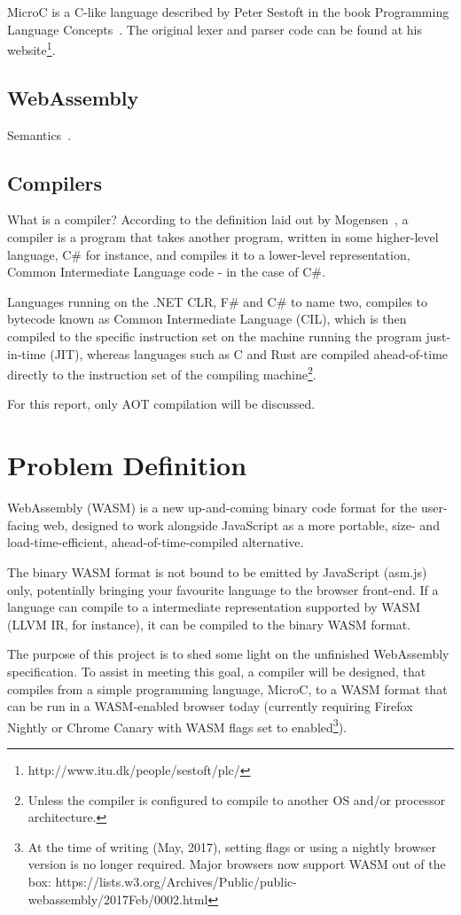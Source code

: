 \documentclass[a4paper]{article}
\begin{document}
MicroC is a C-like language described by Peter Sestoft in the book Programming Language Concepts~\cite{PLC}. The original lexer and parser code can be found at his website\footnote{http://www.itu.dk/people/sestoft/plc/}.


\subsection{WebAssembly}
Semantics~\cite{website:wasm-semantics}.

\subsection{Compilers}
What is a compiler? According to the definition laid out by Mogensen~\cite{BCD}, a compiler is a program that takes another program, written in some higher-level language, C\# for instance, and compiles it to a lower-level representation, Common Intermediate Language code - in the case of C\#.

Languages running on the .NET CLR, F\# and C\# to name two, compiles to bytecode known as Common Intermediate Language (CIL), which is then compiled to the specific instruction set on the machine running the program just-in-time (JIT), whereas languages such as C and Rust are compiled ahead-of-time directly to the instruction set of the compiling machine\footnote{Unless the compiler is configured to compile to another OS and/or processor architecture.}.

For this report, only AOT compilation will be discussed.

\section{Problem Definition}
WebAssembly (WASM) is a new up-and-coming binary code format for the user-facing web, designed to work alongside JavaScript as a more portable, size- and load-time-efficient, ahead-of-time-compiled alternative. 

The binary WASM format is not bound to be emitted by JavaScript (asm.js) only, potentially bringing your favourite language to the browser front-end. If a language can compile to a intermediate representation supported by WASM (LLVM IR, for instance), it can be compiled to the binary WASM format. 

The purpose of this project is to shed some light on the unfinished WebAssembly specification. To assist in meeting this goal, a compiler will be designed, that compiles from a simple programming language, MicroC, to a WASM format that can be run in a WASM-enabled browser today (currently requiring Firefox Nightly or Chrome Canary with WASM flags set to enabled\footnote{At the time of writing (May, 2017), setting flags or using a nightly browser version is no longer required. Major browsers now support WASM out of the box: https://lists.w3.org/Archives/Public/public-webassembly/2017Feb/0002.html}).
\end{document}
